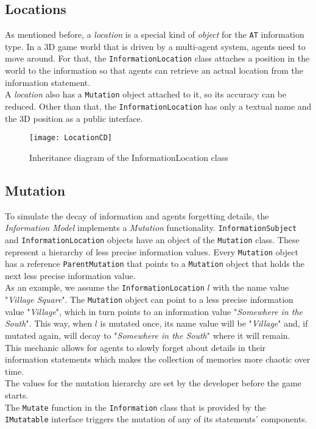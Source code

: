 \subsection{Locations}
As mentioned before, a \textit{location} is a special kind of \textit{object} for the \verb|AT| information type. In a 3D game world that is driven by a multi-agent system, agents need to move around. For that, the \verb|InformationLocation| class attaches a position in the world to the information so that agents can retrieve an actual location from the information statement.\\
A \textit{location} also has a \verb|Mutation| object attached to it, so its accuracy can be reduced. Other than that, the \verb|InformationLocation| has only a textual name and the 3D position as a public interface.
\begin{figure}
	\centering
	\texttt{[image: LocationCD]}
	\caption{Inheritance diagram of the InformationLocation class}
	\label{fig:locationCD}
\end{figure}
\subsection{Mutation}
\label{section:mutation}
To simulate the decay of information and agents forgetting details, the \textit{Information Model} implements a \textit{Mutation} functionality. \verb|InformationSubject| and \verb|InformationLocation| objects have an object of the \verb|Mutation| class. These represent a hierarchy of less precise information values. Every \verb|Mutation| object has a reference \verb|ParentMutation| that points to a \verb|Mutation| object that holds the next less precise information value.\\
As an example, we assume the \verb|InformationLocation| $l$ with the name value "\textit{Village Square}". The \verb|Mutation| object can point to a less precise information value "\textit{Village}", which in turn points to an information value "\textit{Somewhere in the South}". This way, when $l$ is mutated once, its name value will be "\textit{Village}" and, if mutated again, will decay to "\textit{Somewhere in the South}" where it will remain.\\
This mechanic allows for agents to slowly forget about details in their information statements which makes the collection of memories more chaotic over time.\\
The values for the mutation hierarchy are set by the developer before the game starts.\\
The \verb|Mutate| function in the \verb|Information| class that is provided by the \verb|IMutatable| interface triggers the mutation of any of its statements' components.
